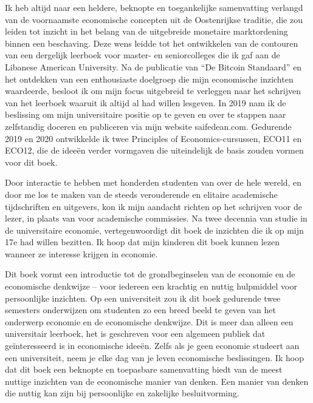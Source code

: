 Ik heb altijd naar een heldere, beknopte en toegankelijke samenvatting verlangd van de voornaamste economische concepten uit de Oostenrijkse traditie, die zou leiden tot inzicht in het belang van de uitgebreide monetaire marktordening binnen een beschaving. Deze wens leidde tot het ontwikkelen van de contouren van een dergelijk leerboek voor master- en seniorcolleges die ik gaf aan de Libanese American University. Na de publicatie van ``De Bitcoin Standaard'' en het ontdekken van een enthousiaste doelgroep die mijn economische inzichten waardeerde, besloot ik om mijn focus uitgebreid te verleggen naar het schrijven van het leerboek waaruit ik altijd al had willen lesgeven. In 2019 nam ik de beslissing om mijn universitaire positie op te geven en over te stappen naar zelfstandig doceren en publiceren via mijn website saifedean.com. Gedurende 2019 en 2020 ontwikkelde ik twee Principles of Economics-cursussen, ECO11 en ECO12, die de ideeën verder vormgaven die uiteindelijk de basis zouden vormen voor dit boek.

Door interactie te hebben met honderden studenten van over de hele wereld, en door me los te maken van de steeds verouderende en elitaire academische tijdschriften en uitgevers, kon ik mijn aandacht richten op het schrijven voor de lezer, in plaats van voor academische commissies. Na twee decennia van studie in de universitaire economie, vertegenwoordigt dit boek de inzichten die ik op mijn 17e had willen bezitten. Ik hoop dat mijn kinderen dit boek kunnen lezen wanneer ze interesse krijgen in economie.

Dit boek vormt een introductie tot de grondbeginselen van de economie en de economische denkwijze – voor iedereen een krachtig en nuttig hulpmiddel voor persoonlijke inzichten. Op een universiteit zou ik dit boek gedurende twee semesters onderwijzen om studenten zo een breed beeld te geven van het onderwerp economie en de economische denkwijze. Dit is meer dan alleen een universitair leerboek, het is geschreven voor een algemeen publiek dat geïnteresseerd is in economische ideeën. Zelfs als je geen economie studeert aan een universiteit, neem je elke dag van je leven economische beslissingen. Ik hoop dat dit boek een beknopte en toepasbare samenvatting biedt van de meest nuttige inzichten van de economische manier van denken. Een manier van denken die nuttig kan zijn bij persoonlijke en zakelijke besluitvorming.

